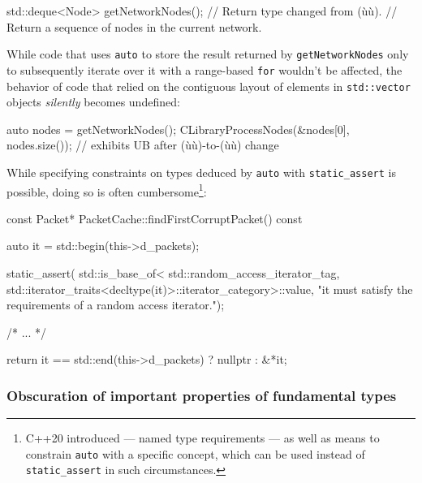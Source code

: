 \begin{emcppslisting}[language=C++]
std::deque<Node> getNetworkNodes();  // Return type changed from (ù{}ù).
    // Return a sequence of nodes in the current network.
\end{emcppslisting}
    
\noindent While code that uses \lstinline!auto! to store the result returned by
\lstinline!getNetworkNodes! only to subsequently iterate over it with a
range-based \lstinline!for! wouldn't be affected, the behavior of code that
relied on the contiguous layout of elements in \lstinline!std::vector!
objects \emph{silently} becomes undefined:

\begin{emcppslisting}[language=C++]
auto nodes = getNetworkNodes();
CLibraryProcessNodes(&nodes[0], nodes.size());  
  // exhibits UB after (ù{}ù)-to-(ù{}ù) change
\end{emcppslisting}
    
\noindent While specifying constraints on types deduced by
\lstinline!auto! with \lstinline!static_assert! is possible, doing so is often
cumbersome{\cprotect\footnote{C++20 introduced  ---
named type requirements --- as well as means to constrain
\lstinline!auto! with a specific concept, which can be used instead of
  \lstinline!static_assert! in such circumstances.}}:

\begin{emcppslisting}[language=C++]
const Packet* PacketCache::findFirstCorruptPacket() const
{
    auto it = std::begin(this->d_packets);

    static_assert(
        std::is_base_of<
            std::random_access_iterator_tag,
            std::iterator_traits<decltype(it)>::iterator_category>::value,
        "it must satisfy the requirements of a random access iterator.");

    /* ... */

    return it == std::end(this->d_packets) ? nullptr : &*it;
}
\end{emcppslisting}
    

\subsubsection[Obscuration of important properties of fundamental types]{Obscuration of important properties of fundamental types}\label{obscuration-of-important-properties-of-fundamental-types}

